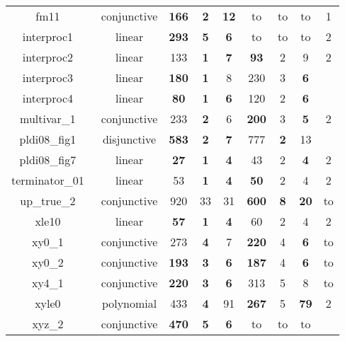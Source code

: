 \begin{table}[t]
\begin{tabular}{l c | c c c | c c c | c | }
\multicolumn{1}{|c|}{fm11~\cite{schwartznon}}					&conjunctive		&\textbf{166} & \textbf{2} &\textbf{12}	& to & to  & to & 1 \\
\multicolumn{1}{|c|}{interproc1~\cite{jeannet2010interproc}}	&linear 			& \textbf{293} & \textbf{5} & \textbf{6} & to & to & to & 2 \\
\multicolumn{1}{|c|}{interproc2~\cite{jeannet2010interproc}}	&linear 			& 133 & \textbf{1} &\textbf{7}	& \textbf{93} & 2 & 9 & 2 \\
\multicolumn{1}{|c|}{interproc3~\cite{jeannet2010interproc}}	&linear 			& \textbf{180} & \textbf{1} & 8 & 230 & 3 & \textbf{6} & \ding{55} \\
\multicolumn{1}{|c|}{interproc4~\cite{jeannet2010interproc}}	&linear 			& \textbf{80} & \textbf{1} &\textbf{6}	& 120 & 2 & \textbf{6} & \ding{55} \\
\multicolumn{1}{|c|}{multivar\_1~\cite{jeannet2010interproc}}		&conjunctive	& 233 & \textbf{2} & 6 & \textbf{200} & 3  & \textbf{5} & 2 \\

\multicolumn{1}{|c|}{pldi08\_fig1~\cite{gulavani2008automatically}}&disjunctive		& \textbf{583} & \textbf{2} & \textbf{7}	& 777 & \textbf{2} & 13 &  \ding{55}\\
\multicolumn{1}{|c|}{pldi08\_fig7~\cite{gulavani2008automatically}}	&linear 		&\textbf{27} & \textbf{1} &\textbf{4}	& 43 & 2 & \textbf{4} & 2 \\
\multicolumn{1}{|c|}{terminator\_01~\cite{Dirk:SVCOMP:2016}}	&linear 			& 53 & \textbf{1} &\textbf{4} & \textbf{50} & 2 & 4	& 2 \\
\multicolumn{1}{|c|}{up\_true\_2~\cite{Dirk:SVCOMP:2016}}		&conjunctive		& 920 & 33 & 31 & \textbf{600} & \textbf{8} & \textbf{20} & to \\
\multicolumn{1}{|c|}{xle10~\cite{sharma2012interpolants}}	&linear 		& \textbf{57} & \textbf{1} &\textbf{4}	& 60 & 2 & 4 & 2 \\
\multicolumn{1}{|c|}{xy0\_1~\cite{sharma2012interpolants}}	&conjunctive	& 273 & \textbf{4} & 7	& \textbf{220} & 4 & \textbf{6}	& to \\
\multicolumn{1}{|c|}{xy0\_2~\cite{sharma2012interpolants}}	&conjunctive	& \textbf{193} & \textbf{3} &\textbf{6}	& \textbf{187} & 4 & \textbf{6} & to \\
\multicolumn{1}{|c|}{xy4\_1~\cite{sharma2012interpolants}}	&conjunctive	& \textbf{220} & \textbf{3} &\textbf{6}	& 313 & 5 & 8 & to \\
\multicolumn{1}{|c|}{xyle0~\cite{sharma2012interpolants}}	&polynomial 	& 433 & \textbf{4} & 91 & \textbf{267} & 5 & \textbf{79} & 2 \\
\multicolumn{1}{|c|}{xyz\_2~\cite{sharma2012interpolants}}	&conjunctive	& \textbf{470} & \textbf{5} & \textbf{6} & to & to & to & \ding{55}\\


\end{tabular}
\end{table}
